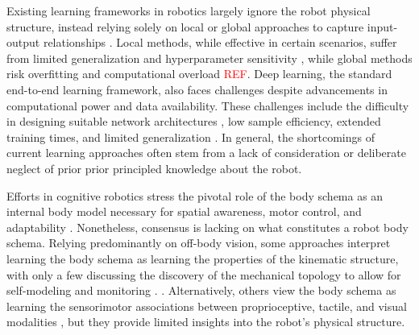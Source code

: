 \documentclass[12pt, a4paper]{article}
\newcommand{\redtext}[1]{\textcolor{red}{#1}}
\begin{document}
Existing learning frameworks in robotics largely ignore the robot physical structure, instead relying solely on local or global approaches to capture input-output relationships \cite{NguyenTuong2011Modellearningrobot}. Local methods, while effective in certain scenarios, suffer from limited generalization and hyperparameter sensitivity \cite{Thrun2002Probabilisticrobotics,Goodfellow2016DeepLearning}, while global methods risk overfitting and computational overload \redtext{REF}. Deep learning, the standard end-to-end learning framework, also faces challenges despite advancements in computational power and data availability. These challenges include the difficulty in designing suitable network architectures \cite{Baker2017Designingneuralnetwork,Elsken2019Neuralarchitecturesearch}, low sample efficiency, extended training times, and limited generalization \cite{Pierson2017Deeplearningrobotics,Suenderhauf2018limitspotentialsdeep}. In general, the shortcomings of current learning approaches often stem from a lack of consideration or deliberate neglect of prior prior principled knowledge about the robot.

Efforts in cognitive robotics stress the pivotal role of the body schema as an internal body model necessary for spatial awareness, motor control, and adaptability \cite{Nguyen2021Sensorimotorrepresentationlearning,Hoffmann2010Bodyschemarobotics}. Nonetheless, consensus is lacking on what constitutes a robot body schema. Relying predominantly on off-body vision, some approaches interpret learning the body schema as learning the properties of the kinematic structure, with only a few discussing the discovery of the mechanical topology to allow for self-modeling and monitoring \cite{Bongard2006Automatedsynthesisbody,Bongard2006Resilientmachinescontinuous}. \cite{Hersch2008Onlinelearningbody,MartinezCantin2010Bodyschemaacquisition,Hart2011roboticmodelecological,Lipson2019Taskagnosticself,Chen2022Fullybodyvisual,Sturm2009Bodyschemalearning}. Alternatively, others view the body schema as learning the sensorimotor associations between proprioceptive, tactile, and visual modalities \cite{Fuke2007BodyImageConstructed,Malinovska2022connectionistmodelassociating,Nguyen2019Reachingdevelopmentvisuo,Pugach2019BrainInspiredCoding,Lanillos2016Yieldingselfperception}, but they provide limited insights into the robot's physical structure. 
\end{document}
